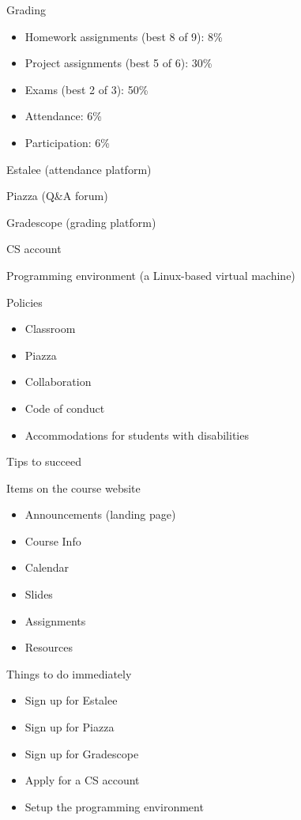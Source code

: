 \documentclass[8pt,a4paper,compress]{beamer}
\begin{document}
\begin{frame}[fragile]
\pause

Grading
\begin{itemize}
\item Homework assignments (best 8 of 9): 8\%
\item Project assignments (best 5 of 6): 30\%
\item Exams (best 2 of 3): 50\%
\item Attendance: 6\%
\item Participation: 6\%
\end{itemize}

\pause
\bigskip

Estalee (attendance platform)

\pause
\bigskip

Piazza (Q\&A forum)

\pause
\bigskip

Gradescope (grading platform)

\pause
\bigskip

CS account

\pause
\bigskip

Programming environment (a Linux-based virtual machine)

\pause
\bigskip

Policies
\begin{itemize}
\item Classroom
\item Piazza
\item Collaboration
\item Code of conduct
\item Accommodations for students with disabilities
\end{itemize}
\end{frame}

\begin{frame}[fragile]
\pause

Tips to succeed

\pause
\bigskip

Items on the course website
\begin{itemize}
\item Announcements (landing page)
\item Course Info
\item Calendar
\item Slides 
\item Assignments
\item Resources
\end{itemize}

\pause
\bigskip

Things to do immediately
\begin{itemize}
\item Sign up for Estalee
\item Sign up for Piazza
\item Sign up for Gradescope
\item Apply for a CS account
\item Setup the programming environment
\end{itemize}
\end{frame}
\end{document}
